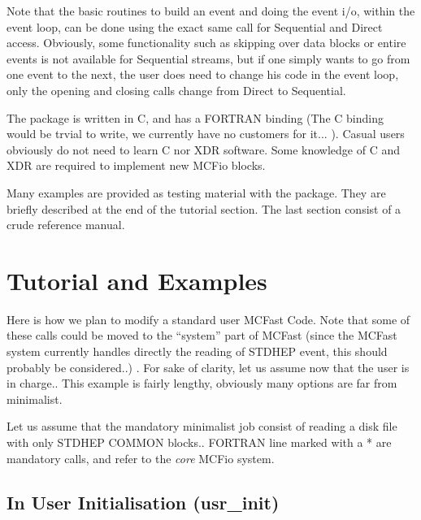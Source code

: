 	Note that the basic routines to build an event and doing the 
event i/o, within the event loop, can be done using the exact same call 
for Sequential and Direct access.  Obviously, some functionality such as 
skipping over data blocks or entire events is not available for Sequential 
streams, but if one simply wants to go from one event to the next, 
the user does need to change his code in the event loop, only the opening 
and closing calls change from Direct to Sequential.  

	The package is written in C, and has a FORTRAN binding  (The 
C binding would be trvial to write, we currently have no customers for it... ).
Casual users obviously do not need to learn C nor XDR software. Some knowledge 
of C and XDR are required to implement new MCFio blocks.

	Many examples are provided as testing material with the package. 
They are briefly described at the end of the tutorial section. The last 
section consist of a crude reference manual. 

\section{Tutorial and Examples}


Here is how we plan to modify a standard user MCFast Code. Note that  some of
these calls could be moved to the ``system'' part of MCFast (since the MCFast
system  currently handles directly the  reading of STDHEP event, this  should
probably be considered..) . For sake of clarity, let us assume now that the
user is in charge.. This example is fairly lengthy, obviously many  options are
far from minimalist.
 
\vspace{.1in}
  Let us assume that the mandatory  minimalist job
consist of reading a disk file with only STDHEP COMMON blocks.. FORTRAN line 
marked with a * are mandatory calls, and refer to the {\em core } MCFio 
system. 
 

\subsection{In User Initialisation (usr\_init)}
 

